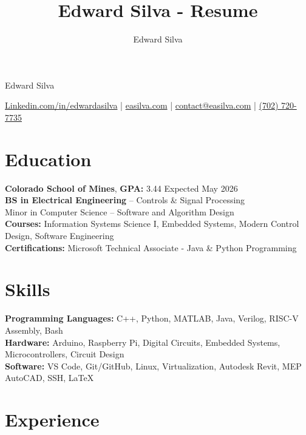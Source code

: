 \documentclass[11pt]{article}
\title{Edward Silva - Resume}
\author{Edward Silva}
\begin{document}
\thispagestyle{empty}

\centerline{\huge Edward Silva}
\vspace{3pt}

\centerline{
\href{https://www.linkedin.com/in/edwardasilva/}{Linkedin.com/in/edwardasilva}
| \href{https://easilva.com}{easilva.com}
| \href{mailto:contact@easilva.com}{contact@easilva.com} 
| \href{tel:702 720-7735}{(702) 720-7735}
}

\vspace{-10pt}
\section*{Education}
\vspace{1pt}

\textbf{Colorado School of Mines}, \textbf{GPA:} 3.44  \hfill Expected May 2026\\
\textbf{BS in Electrical Engineering} -- Controls \& Signal Processing  \\
Minor in Computer Science -- Software and Algorithm Design\\
\textbf{Courses:} Information Systems Science I, Embedded Systems, Modern Control Design, Software Engineering\\
\textbf{Certifications:} Microsoft Technical Associate - Java \& Python Programming

\vspace{-10pt}
\section*{Skills}
\vspace{0pt}

\textbf{Programming Languages:} C++, Python, MATLAB, Java, Verilog, RISC-V Assembly, Bash \\
\textbf{Hardware:} Arduino, Raspberry Pi, Digital Circuits, Embedded Systems, Microcontrollers, Circuit Design \\
\textbf{Software:} VS Code, Git/GitHub, Linux, Virtualization, Autodesk Revit, MEP AutoCAD, SSH, LaTeX \\

\vspace{-14pt}
\section*{Experience}
\vspace{5pt}
\end{document}
